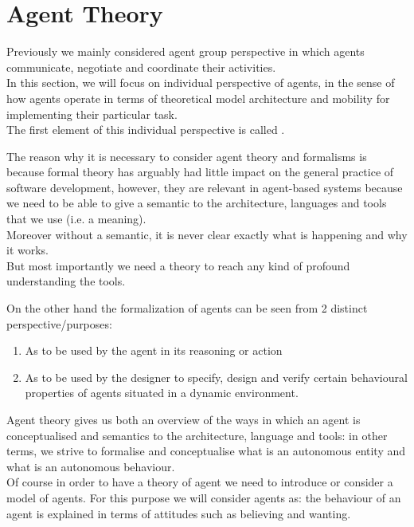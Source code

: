 

\chapter{Agent Theory}
\minitoc

Previously we mainly considered agent group perspective in which agents communicate, negotiate and coordinate their activities.\\
In this section, we will focus on individual perspective of agents, in the sense of how agents operate in terms of theoretical model architecture and mobility for implementing their particular task.\\
The first element of this individual perspective is called .

The reason why it is necessary to consider agent theory and formalisms is because formal theory has arguably had little impact on the general practice of software development, however, they are relevant in agent-based systems because we need to be able to give a semantic to the architecture, languages and tools that we use (i.e. a meaning).\\
Moreover without a semantic, it is never clear exactly what is happening and why it works.\\
But most importantly we need a theory to reach any kind of profound understanding the tools.

On the other hand the formalization of agents can be seen from 2 distinct perspective/purposes:
\begin{enumerate}
\item As  to be used by the agent in its reasoning or action
\item As  to be used by the designer to specify, design and verify certain behavioural properties of agents situated in a dynamic environment.
\end{enumerate}

Agent theory gives us both an overview of the ways in which an agent is conceptualised and semantics to the architecture, language and tools: in other terms, we strive to formalise and conceptualise what is an autonomous entity and what is an autonomous behaviour.\\
Of course in order to have a theory of agent we need to introduce or consider a model of agents. For this purpose we will consider agents as: the behaviour of an agent is explained in terms of attitudes such as believing and wanting.

